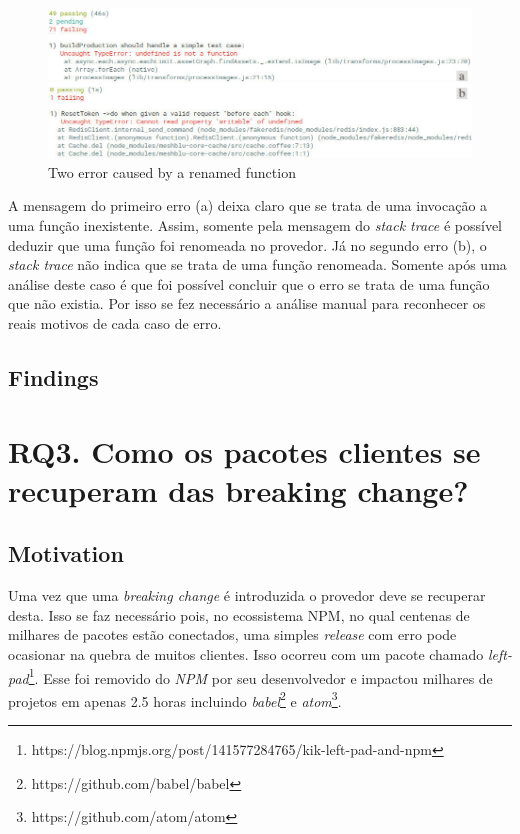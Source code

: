 \begin{figure}[!h]
    \centering
    \includegraphics[scale=0.5]{figuras/error_category.jpeg}
    \caption{Two error caused by a renamed function}
    \label{fig:error_category}
\end{figure}

A mensagem do primeiro erro (a) deixa claro que se trata de uma invocação a uma função inexistente. Assim, somente pela mensagem do \textit{stack trace} é possível deduzir que uma função foi renomeada no provedor. Já no segundo erro (b), o \textit{stack trace} não indica que se trata de uma função renomeada. Somente após uma análise deste caso é que foi possível concluir que o erro se trata de uma função que não existia. Por isso se fez necessário a análise manual para reconhecer os reais motivos de cada caso de erro.

\subsection{Findings}
\label{fin:rq2}

\section{RQ3. Como os pacotes clientes se recuperam das breaking change?}
\label{sec:rq3}

\subsection{Motivation}
\label{mot:rq3}

Uma vez que uma \textit{breaking change} é introduzida o provedor deve se recuperar desta. Isso se faz necessário pois, no ecossistema \gls{NPM}, no qual centenas de milhares de pacotes estão conectados, uma simples \textit{release} com erro pode ocasionar na quebra de muitos clientes. Isso ocorreu com um pacote chamado \textit{left-pad}\footnote{https://blog.npmjs.org/post/141577284765/kik-left-pad-and-npm}. Esse foi removido do \textit{NPM} por seu desenvolvedor e impactou milhares de projetos em apenas 2.5 horas incluindo \textit{babel}\footnote{https://github.com/babel/babel} e \textit{atom}\footnote{https://github.com/atom/atom}.


